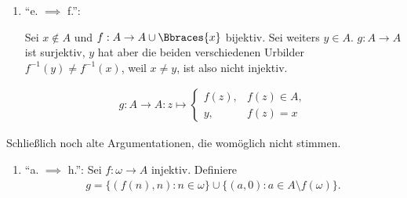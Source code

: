 \begin{solution}
\begin{enumerate}[label = \texttt{ad}]

  \item \enquote{e. $\implies$ f.}:

  Sei $x \not \in A$ und $f: A \to A \cup \Bbraces{x}$ bijektiv.
  Sei weiters $y \in A$.
  $g: A \to A$ ist surjektiv, $y$ hat aber die beiden verschiedenen Urbilder $f^{-1}(y) \neq f^{-1}(x)$, weil $x \neq y$, ist also nicht injektiv.

  \begin{align*}
    g:
    A \to A:
    z
    \mapsto
    \begin{cases}
      f(z), & f(z) \in A, \\
      y,    & f(z) = x
    \end{cases}
  \end{align*}
\end{enumerate}



Schließlich noch alte Argumentationen, die womöglich nicht stimmen.

\begin{enumerate}[label = \texttt{ad}]
	\item \enquote{a. $\implies$ h.}: Sei $f: \omega \to A$ injektiv. Definiere
	\begin{align*}
	g = \{(f(n), n): n \in \omega\} \cup \{(a,0): a \in A \setminus f(\omega)\}.
	\end{align*}
\end{enumerate}

\end{solution}

